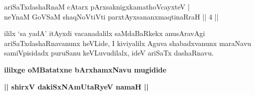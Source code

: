 \begin{shl}
ariSaTxdashaRnaM cAtarx pArxsaknigxkamathoVcayxteV | \\
neYnaM GoVSaM shaqNoVtiVti parxtAyxsananxmaqtinaRraH \hfill ||  4 || 
\end{shl}

\begin{artha}
ililx `sa yadA' itAyxdi vacanadalilx saMdaBaRkekx anusAravAgi ariSaTxdashaRnavanunx heVLide, I kiviyalilx Aguva shabadxvanunx maraNavu samiVpisidadx puruSanu keVLuvudilalx, ideV ariSaTx dashaRnavu.
\end{artha}

\begin{center}
{\bf ililxge oMBatatxne bArxhamxNavu mugidide}
\smallskip

{\bf || shirxV dakiSxNAmUtaRyeV namaH ||}
\end{center}
